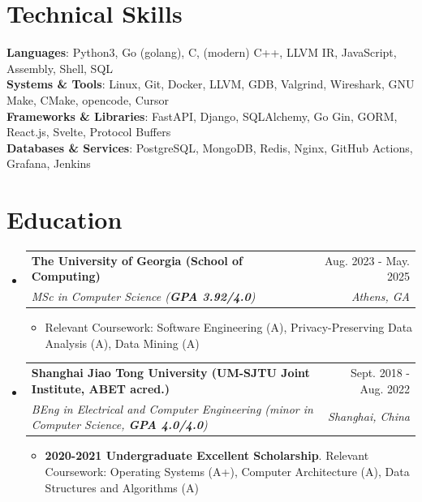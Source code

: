 \documentclass[letterpaper,11pt]{article}
\makeatletter
\newcommand{\resumeItem}[1]{
  \item\small{
    {#1 \vspace{-2pt}}
  }
}
\newcommand{\resumeSubHeader}[4]{
  \vspace{-2pt}\item
    \begin{tabular*}{0.98\textwidth}[t]{l@{\extracolsep{\fill}}r}
      \textbf{#1} & #2 \\
      \textit{\small#3} & \textit{\small #4} \\
    \end{tabular*}\vspace{-8pt}
}
\newcommand{\resumeSubHeaderListStart}{\begin{itemize}[leftmargin=0.15in, label={}]}
\newcommand{\resumeSubHeaderListEnd}{\end{itemize}}
\newcommand{\resumeItemListStart}{\begin{itemize}}
\newcommand{\resumeItemListEnd}{\end{itemize}\vspace{-5pt}}
\makeatother
\begin{document}
\section{Technical Skills}
 \begin{itemize}[leftmargin=0.15in, label={}]
    \small{
      \item{
     \textbf{Languages}{: Python3, Go (golang), C, (modern) C++, LLVM IR, JavaScript, Assembly, Shell, SQL} \\
     \textbf{Systems \& Tools}{: Linux, Git, Docker, LLVM, GDB, Valgrind, Wireshark, GNU Make, CMake, opencode, Cursor} \\
     \textbf{Frameworks \& Libraries}{: FastAPI, Django, SQLAlchemy, Go Gin, GORM, React.js, Svelte, Protocol Buffers} \\
     \textbf{Databases \& Services}{: PostgreSQL, MongoDB, Redis, Nginx, GitHub Actions, Grafana, Jenkins}
    }}
 \end{itemize}

\section{Education}
  \resumeSubHeaderListStart
    \resumeSubHeader
      {The University of Georgia (School of Computing)}{Aug. 2023 - May. 2025}
      {MSc in Computer Science (\textbf{GPA 3.92/4.0})}{Athens, GA}
      \resumeItemListStart
        \resumeItem{Relevant Coursework: Software Engineering (A), Privacy-Preserving Data Analysis (A), Data Mining (A)}
      \resumeItemListEnd

    \resumeSubHeader
      {Shanghai Jiao Tong University (UM-SJTU Joint Institute, ABET acred.)}{Sept. 2018 - Aug. 2022}
      {BEng in Electrical and Computer Engineering (minor in Computer Science, \textbf{GPA 4.0/4.0})}{Shanghai, China}
      \resumeItemListStart
        \resumeItem{\textbf{2020-2021 Undergraduate Excellent Scholarship}. Relevant Coursework: Operating Systems (A+), Computer Architecture (A), Data Structures and Algorithms (A)}
      \resumeItemListEnd
  \resumeSubHeaderListEnd
\end{document}
